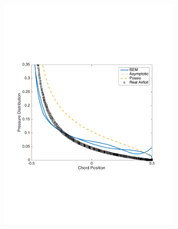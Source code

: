\documentclass{article}
\begin{document}
\begin{figure}[h]
\centering
\begin{subfigure}{0.3\textwidth}
	\centering
	\includegraphics[width = \textwidth, height=0.16\textheight]{NACA1101_pressure_k5mag}
\end{subfigure}%
\begin{subfigure}{0.3\textwidth}
	\centering

\end{subfigure}
\end{figure}
\end{document}
